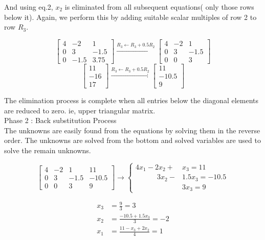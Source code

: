 	And using eq.2, $x_2$ is eliminated from all subsequent equations( only those rows below it). Again, we perform this by adding suitable scalar multiples of row 2 to row $R_3$.

	\[ \begin{bmatrix} 4 & -2 & 1 \\ 0 & 3 & -1.5 \\ 0 & -1.5 & 3.75 \end{bmatrix} \xrightarrow{R_3 \leftarrow R_3 + 0.5R_2} \begin{bmatrix} 4 & -2 & 1 \\ 0 & 3 & -1.5 \\ 0 & 0 & 3 \end{bmatrix} \]
	\[ \begin{bmatrix} 11 \\ -16 \\ 17 \end{bmatrix}  \xrightarrow{R_3 \leftarrow R_3 + 0.5R_2} \begin{bmatrix} 11 \\ -10.5 \\ 9 \end{bmatrix} \]

	The elimination process is complete when all entries below the diagonal elements are reduced to zero. ie, upper triangular matrix.\\

	Phase 2 : Back substitution Process\\

	The unknowns are easily found from the equations by solving them in the reverse order. The unknowns are solved from the bottom and solved variables are used to solve the remain unknowns.

	\[ \begin{bmatrix} 4 & -2 & 1 & 11 \\ 0 & 3 & -1.5 & -10.5 \\ 0 & 0 & 3 & 9 \end{bmatrix} \to \begin{cases} 4x_1 - 2x_2 + &x_3  = 11 \\ \quad \qquad 3x_2 - &1.5x_3  = -10.5 \\  &3x_3 = 9 \end{cases}  \]

	\begin{align*} x_3 & = \frac{9}{3} = 3 \\  x_2 & = \frac{-10.5 + 1.5x_3}{3} = -2 \\ x_1 & = \frac{11-x_3+2x_2}{4}=1 \end{align*}

